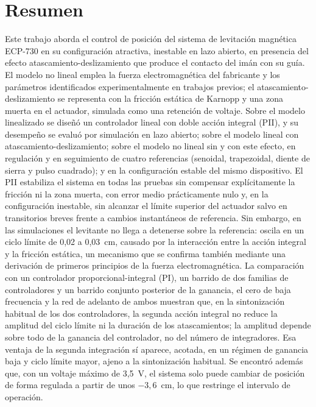 \chapter*{Resumen}\label{Chap:Resumen}

Este trabajo aborda el control de posición del sistema de levitación magnética ECP-730 en su configuración atractiva, inestable en lazo abierto, en presencia del efecto atascamiento-deslizamiento que produce el contacto del imán con su guía. El modelo no lineal emplea la fuerza electromagnética del fabricante y los parámetros identificados experimentalmente en trabajos previos; el atascamiento-deslizamiento se representa con la fricción estática de Karnopp y una zona muerta en el actuador, simulada como una retención de voltaje. Sobre el modelo linealizado se diseñó un controlador lineal con doble acción integral (PII), y su desempeño se evaluó por simulación en lazo abierto; sobre el modelo lineal con atascamiento-deslizamiento; sobre el modelo no lineal sin y con este efecto, en regulación y en seguimiento de cuatro referencias (senoidal, trapezoidal, diente de sierra y pulso cuadrado); y en la configuración estable del mismo dispositivo. El PII estabiliza el sistema en todas las pruebas sin compensar explícitamente la fricción ni la zona muerta, con error medio prácticamente nulo y, en la configuración inestable, sin alcanzar el límite superior del actuador salvo en transitorios breves frente a cambios instantáneos de referencia. Sin embargo, en las simulaciones el levitante no llega a detenerse sobre la referencia: oscila en un ciclo límite de 0,02 a 0,03~cm, causado por la interacción entre la acción integral y la fricción estática, un mecanismo que se confirma también mediante una derivación de primeros principios de la fuerza electromagnética. La comparación con un controlador proporcional-integral (PI), un barrido de dos familias de controladores y un barrido conjunto posterior de la ganancia, el cero de baja frecuencia y la red de adelanto de ambos muestran que, en la sintonización habitual de los dos controladores, la segunda acción integral no reduce la amplitud del ciclo límite ni la duración de los atascamientos; la amplitud depende sobre todo de la ganancia del controlador, no del número de integradores. Esa ventaja de la segunda integración sí aparece, acotada, en un régimen de ganancia baja y ciclo límite mayor, ajeno a la sintonización habitual. Se encontró además que, con un voltaje máximo de 3,5~V, el sistema solo puede cambiar de posición de forma regulada a partir de unos $-3{,}6$~cm, lo que restringe el intervalo de operación.
